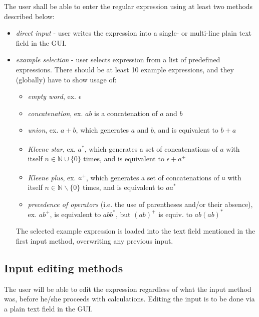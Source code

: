 \documentclass{article}
\begin{document}
The user shall be able to enter the regular expression using at least
two methods described below:
\begin{itemize}

  \item \textit{direct input} - user writes the expression into a single- or multi-line plain text
  field in the GUI.


  \item \textit{example selection} -  user selects expression from a list of predefined expressions.
  There should be at least 10 example expressions, and they (globally) have to show usage of:
  \begin{itemize}[noitemsep,nolistsep]

    \item \textit{empty word}, ex. $\epsilon$

    \item \textit{concatenation}, ex. $ab$ is a concatenation of $a$ and $b$

    \item \textit{union}, ex. $a+b$, which generates $a$ and $b$, and is equivalent to $b+a$

    \item \textit{Kleene star}\textsuperscript{\cite{wiki_kleenestar}}, ex. $a^*$, which generates a
    set of concatenations of $a$ with itself $n \in \mathbb{N}\cup\{0\}$ times, and is equivalent to
    $\epsilon+a^+$

    \item \textit{Kleene plus}\textsuperscript{\cite{wiki_kleenestar}}, ex. $a^+$, which generates a
    set of concatenations of $a$ with itself $n \in \mathbb{N}\backslash\{0\}$ times, and is
    equivalent to $aa^*$

    \item \textit{precedence of operators} (i.e. the use of parentheses and/or their absence), ex.
    $ab^+$, is equivalent to $abb^*$, but $(ab)^+$ is equiv. to $ab(ab)^*$

  \end{itemize}
  
  The selected example expression is loaded into the text field mentioned in the first input method,
  overwriting any previous input.

\end{itemize}

\subsection{Input editing methods}
The user will be able to edit the expression regardless of what the input method was, before he/she
proceeds with calculations. Editing the input is to be done via a plain text field in the GUI.
\end{document}
